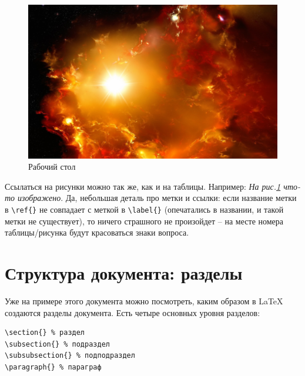 \documentclass[12pt]{article}
\begin{document}
\begin{figure}[ht!]
\centering
\caption{Рабочий стол}
\label{im:galaxy}
\includegraphics[scale=0.4]{desktop.png}
\end{figure}

Ссылаться на рисунки можно так же, как и на таблицы. Например: \textit{На рис.\ref{im:galaxy} что-то изображено}. Да, небольшая деталь про метки и ссылки: если название метки в \texttt{\textbackslash ref\{\}} не совпадает с меткой в \texttt{\textbackslash label\{\}} (опечатались в названии, и такой метки не существует), то ничего страшного не произойдет -- на месте номера таблицы/рисунка будут красоваться знаки вопроса.
 
\section{Структура документа: разделы}

Уже на примере этого документа можно посмотреть, каким образом в \LaTeX{} создаются разделы документа. Есть четыре основных уровня разделов:

\begin{center}
\begin{BVerbatim}
\section{} % раздел
\subsection{} % подраздел
\subsubsection{} % подподраздел
\paragraph{} % параграф
\end{BVerbatim}
\end{center}
\end{document}
